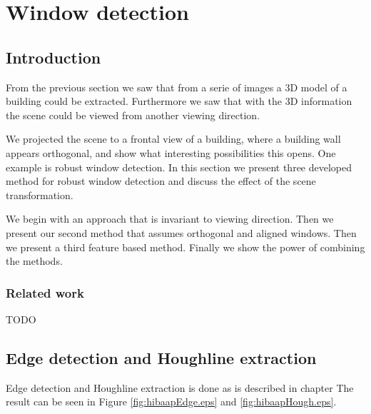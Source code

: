 %
%
\section{Window detection}
\label{chap:windowDetection}
\subsection{Introduction}
From the previous section we saw that from a serie of images a 3D model of a
building could be extracted. Furthermore we saw that with the 3D information the
scene could be viewed from another viewing direction. 

We projected the scene to a frontal view of a building, where a building wall appears
orthogonal, and show what interesting possibilities this opens.
One example is robust window detection.
In this section we present three developed method for robust window detection
and discuss the effect of the scene transformation.

We begin with an approach that is invariant to viewing direction.  Then we
present our second method that assumes orthogonal and aligned windows.  Then we
present a third feature based method.  Finally we show the power of combining
the methods.



\subsubsection{Related work}
TODO

\subsection{Edge detection and Houghline extraction} 
Edge detection and Houghline extraction is done as is described in chapter
The result can be seen in Figure \ref{fig:hibaapEdge.eps} and
\ref{fig:hibaapHough.eps}.

